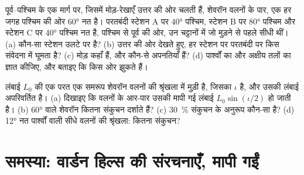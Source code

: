\begin{exercise}[$\star\star\star$]
\label{exo:b1:faults-folds-fabrics:11}
पूर्व–पश्चिम के एक मार्ग पर, जिसमें मोड़-रेखाएँ उत्तर की ओर चलती हैं, शेवरॉन वलनों के पार, एक  हर जगह पश्चिम की ओर \ang{60} नत है। परतबंदी स्टेशन A पर \ang{40} पश्चिम, स्टेशन B पर \ang{80} पश्चिम और स्टेशन C पर \ang{40} पश्चिम नत है, पश्चिम से पूर्व की ओर, उन चट्टानों में जो मुड़ने से पहले सीधी थीं। (a) कौन-सा स्टेशन उलटे  पर है? (b) उत्तर की ओर देखते हुए, हर स्टेशन पर  परतबंदी पर किस संवेदना में घूमता है? (c) मोड़ कहाँ हैं, और कौन-से अपनतियाँ हैं? (d) पार्श्वों का  और अक्षीय तलों का  ज्ञात कीजिए, और बताइए कि  किस ओर झुकते हैं।
\end{exercise}

\begin{exercise}[$\star\star\star$]
\label{exo:b1:faults-folds-fabrics:12}
लंबाई $L_0$ की एक परत एक समरूप शेवरॉन वलनों की श्रृंखला में मुड़ी है, जिसका  $\iota$ है, और उसकी लंबाई अपरिवर्तित है। (a) दिखाइए कि वलनों के आर-पार उसकी मापी गई लंबाई $L_0\sin(\iota/2)$ हो जाती है। (b) \ang{60}  वाले शेवरॉन  कितना संकुचन दर्शाते हैं? (c) \qty{30}{\percent} संकुचन के अनुरूप कौन-सा  है? (d) \ang{12} नत पार्श्वों वाली सीधे वलनों की श्रृंखला: कितना संकुचन?
\end{exercise}

\section{समस्या: वार्डन हिल्स की संरचनाएँ, मापी गईं}

